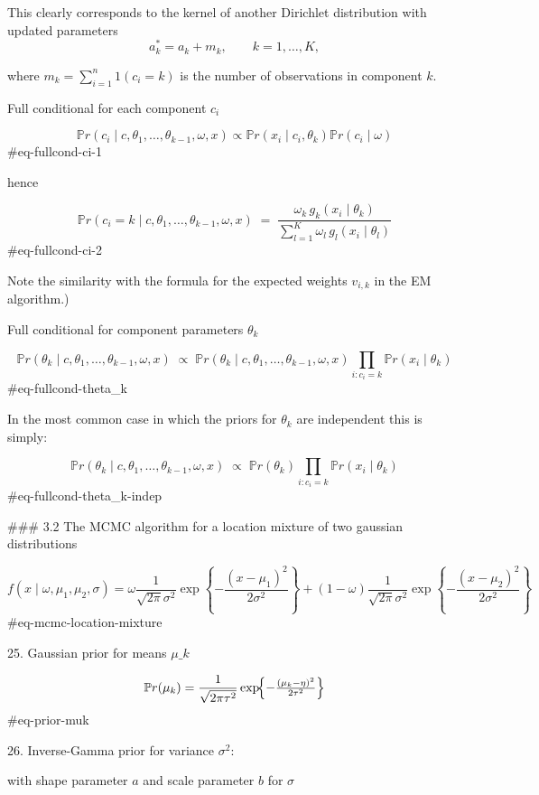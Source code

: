 This clearly corresponds to the kernel of another Dirichlet distribution
with updated parameters
$$
a_k^* = a_k + m_k, \qquad k = 1, \ldots, K,
$$

where $m_k = \sum_{i=1}^n 1(c_i = k)$ is the number of observations in component $k$.

Full conditional for each component $c_i$

$$
\mathbb{P}r(c_i \mid c,\theta_1,\ldots,\theta_{k-1},\omega,x) \propto \mathbb{P}r(x_i \mid c_i,\theta_k) \mathbb{P}r(c_i \mid \omega)
$$ {#eq-fullcond-ci-1}

hence

$$
\mathbb{P}r(c_i = k \mid c,\theta_1,\ldots,\theta_{k-1},\omega,x)
\;=\;
\frac{\omega_k\,g_k(x_i\mid \theta_k)}
     {\sum_{l=1}^K \omega_l\,g_l(x_i\mid \theta_l)}
$$ {#eq-fullcond-ci-2}

Note the similarity with the formula for the expected weights $v_{i,k}$ in the
EM algorithm.) 

Full conditional for component parameters $\theta_k$

$$
\mathbb{P}r(\theta_k \mid c,\theta_1,\ldots,\theta_{k-1},\omega,x)
\;\propto\;
\mathbb{P}r(\theta_k \mid c,\theta_1,\ldots,\theta_{k-1},\omega,x)
\prod_{i:c_i=k} \mathbb{P}r(x_i\mid \theta_k)
$$ {#eq-fullcond-theta_k}

In the most common case in which the priors for $\theta_k$ are independent this is simply:

$$
\mathbb{P}r(\theta_k \mid c,\theta_1,\ldots,\theta_{k-1},\omega,x) 
\;\propto\;
\mathbb{P}r(\theta_k) \prod_{i:c_i=k} \mathbb{P}r(x_i\mid \theta_k)
$$ {#eq-fullcond-theta_k-indep}



### 3.2 The MCMC algorithm for a location mixture of two gaussian distributions

$$
f(x \mid \omega, \mu_1, \mu_2, \sigma) = \omega \frac{1}{\sqrt{2\pi}\sigma^2} \exp\left\{ -\frac{(x - \mu_1)^2}{2\sigma^2} \right\} + (1-\omega) \frac{1}{\sqrt{2\pi}\sigma^2} \exp\left\{ -\frac{(x - \mu_2)^2}{2\sigma^2} \right\}
$$ {#eq-mcmc-location-mixture}

25. Gaussian prior for means $\mu\_k$

$$
\mathbb{P}r(\mu_k)
=\frac{1}{\sqrt{2\pi\tau^2}}
\exp\!\Bigl\{-\tfrac{(\mu_k-\eta)^2}{2\tau^2}\Bigr\}
$$ {#eq-prior-muk}

26. Inverse-Gamma prior for variance $\sigma^2$:

with shape parameter $a$ and scale parameter $b$ for $\sigma$

